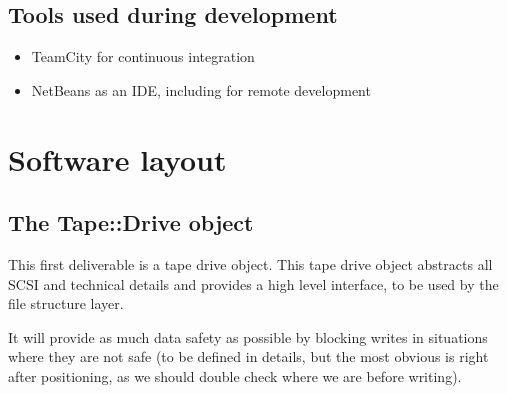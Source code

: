 \subsection{Tools used during development}
\begin{itemize}
\item{}TeamCity for continuous integration
\item{}NetBeans as an IDE, including for remote development\
\end{itemize}

\section{Software layout}

\subsection{The Tape::Drive object}

This first deliverable is a tape drive object. This tape drive object abstracts all
SCSI and technical details and provides a high level interface, to be used by the 
file structure layer.

It will provide as much data safety as possible by blocking writes in situations
where they are not safe (to be defined in details, but the most obvious is right
after positioning, as we should double check where we are before writing).

